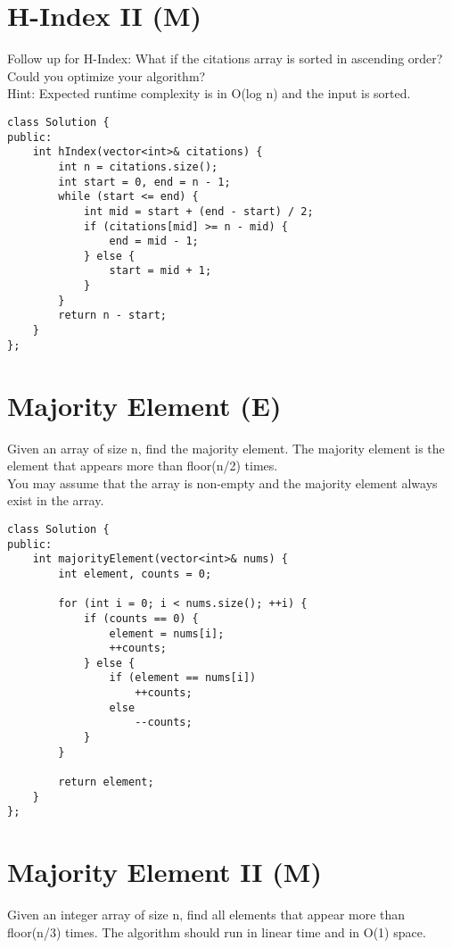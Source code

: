 \section{H-Index II (M)}
Follow up for H-Index: What if the citations array is sorted in ascending order? Could you optimize your algorithm? \\

Hint: Expected runtime complexity is in O(log n) and the input is sorted.\\

\begin{lstlisting}
class Solution {
public:
    int hIndex(vector<int>& citations) {
        int n = citations.size();
        int start = 0, end = n - 1;
        while (start <= end) {
            int mid = start + (end - start) / 2;
            if (citations[mid] >= n - mid) {
                end = mid - 1;
            } else {
                start = mid + 1;
            }
        }
        return n - start;
    }
};
\end{lstlisting}


\section{Majority Element (E)}
Given an array of size n, find the majority element. The majority element is the element that appears more than floor(n/2) times.\\

You may assume that the array is non-empty and the majority element always exist in the array.\\

\begin{lstlisting}
class Solution {
public:
    int majorityElement(vector<int>& nums) {
        int element, counts = 0;
        
        for (int i = 0; i < nums.size(); ++i) {
            if (counts == 0) {
                element = nums[i];
                ++counts;
            } else {
                if (element == nums[i])
                    ++counts;
                else
                    --counts;
            }
        }
        
        return element;
    }
};
\end{lstlisting}


\section{Majority Element II (M)}
Given an integer array of size n, find all elements that appear more than floor(n/3) times. The algorithm should run in linear time and in O(1) space. \\

